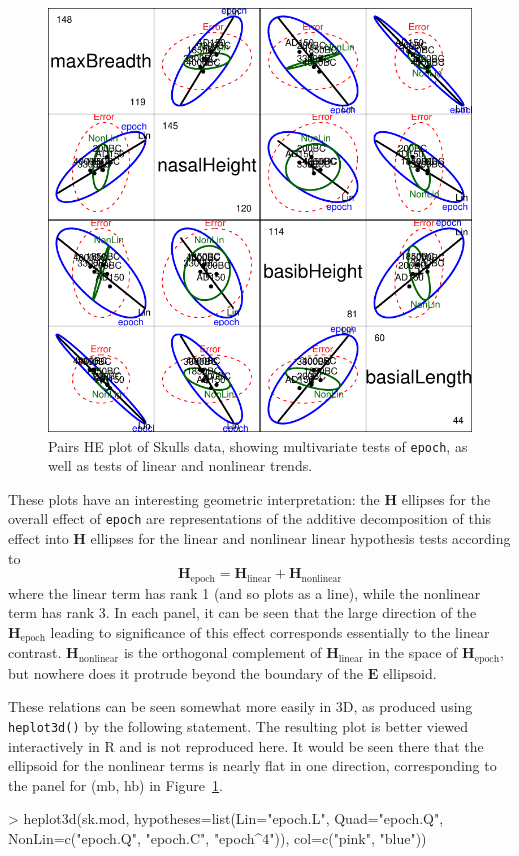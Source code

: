 \documentclass[11pt]{article}
\newcommand{\mat}[1]{\ensuremath{\bm{#1}}}
\newcommand{\figref}[1]{Figure~\ref{#1}}
\newcommand{\code}[1]{{\texttt{#1}}}
\newcommand{\func}[1]{{\texttt{#1()}}}
\begin{document}
\begin{figure}[htb]
\begin{center}
	\includegraphics[width=.8\textwidth]{fig/plot-skulls-HE-pairs}
\caption{Pairs HE plot of Skulls data, showing multivariate tests of
	\code{epoch}, as well as tests of linear and nonlinear trends.}
\label{fig:skulls-HE-pairs}
\end{center}
\end{figure}
These plots have an interesting geometric interpretation:
the $\mat{H}$ ellipses for the overall effect of \code{epoch}
are representations of the additive decomposition of this effect into  
$\mat{H}$ ellipses for the linear and nonlinear linear
hypothesis tests according to
\begin{equation*}
	\mat{H}_{\textrm{epoch}} = \mat{H}_{\textrm{linear}} + \mat{H}_{\textrm{nonlinear}}
\end{equation*}
where the linear term has rank 1 (and so plots as a line), while the nonlinear
term has rank 3.  In each panel, it can be seen that the large direction of
the $\mat{H}_{\textrm{epoch}}$ leading to significance of this effect corresponds
essentially to the linear contrast.  $\mat{H}_{\textrm{nonlinear}}$ is the orthogonal
complement of $\mat{H}_{\textrm{linear}}$ in the space of $\mat{H}_{\textrm{epoch}}$,
but nowhere does it protrude beyond the boundary of the $\mat{E}$ ellipsoid.

These relations can be seen somewhat more easily in 3D, as produced using
\func{heplot3d} by the following statement.  The resulting plot is
better viewed interactively in R and is not reproduced here.
It would be seen there that the ellipsoid for the nonlinear terms
is nearly flat in one direction, corresponding to the panel for
(mb, hb) in \figref{fig:skulls-HE-pairs}.
\begin{Schunk}
\begin{Sinput}
> heplot3d(sk.mod, hypotheses=list(Lin="epoch.L", Quad="epoch.Q", 
                              NonLin=c("epoch.Q", "epoch.C", "epoch^4")), 
  	col=c("pink", "blue"))
\end{Sinput}
\end{Schunk}
\end{document}
